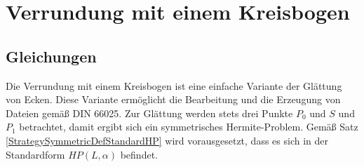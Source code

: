 %
%
%



\chapter{Verrundung mit einem Kreisbogen}


\section{Gleichungen}

Die Verrundung mit einem Kreisbogen ist eine einfache Variante der Glättung von Ecken. Diese Variante ermöglicht die Bearbeitung und die Erzeugung von Dateien gemäß DIN 66025. Zur Glättung werden stets drei Punkte $P_0$ und $S$ und $P_1$ betrachtet, damit ergibt sich ein symmetrisches Hermite-Problem. Gemäß Satz \ref{StrategySymmetricDefStandardHP} wird vorausgesetzt, dass es sich in der Standardform $HP(L,\alpha)$ befindet.
 
 \bigskip
 
 
 
